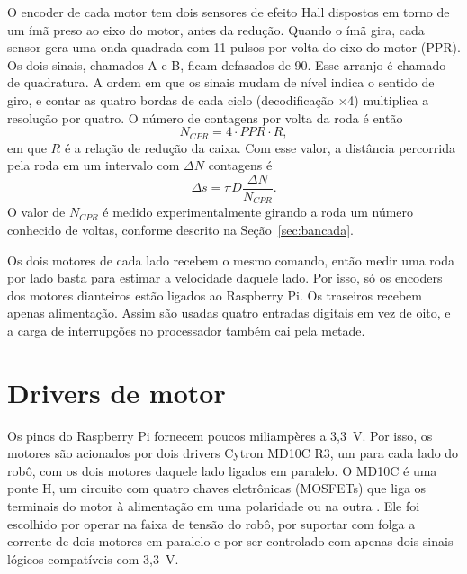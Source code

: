O encoder de cada motor tem dois sensores de efeito Hall dispostos em
torno de um ímã preso ao eixo do motor, antes da redução. Quando o ímã
gira, cada sensor gera uma onda quadrada com 11 pulsos por volta do eixo
do motor (PPR). Os dois sinais, chamados A e B, ficam defasados de
90\textdegree. Esse arranjo é chamado de quadratura. A ordem em que os
sinais mudam de nível indica o sentido de giro, e contar as quatro bordas
de cada ciclo (decodificação $\times$4) multiplica a resolução por quatro.
O número de contagens por volta da roda é então
\begin{equation}
	\label{eq:cpr}
	N_{CPR} = 4 \cdot PPR \cdot R,
\end{equation}
em que $R$ é a relação de redução da caixa. Com esse valor, a distância
percorrida pela roda em um intervalo com $\Delta N$ contagens é
\begin{equation}
	\label{eq:deslocamento}
	\Delta s = \pi D \frac{\Delta N}{N_{CPR}}.
\end{equation}
O valor de $N_{CPR}$ é medido experimentalmente girando a roda um número
conhecido de voltas, conforme descrito na Seção~\ref{sec:bancada}.

Os dois motores de cada lado recebem o mesmo comando, então medir uma
roda por lado basta para estimar a velocidade daquele lado. Por isso, só
os encoders dos motores dianteiros estão ligados ao Raspberry Pi. Os
traseiros recebem apenas alimentação. Assim são usadas quatro entradas
digitais em vez de oito, e a carga de interrupções no processador também
cai pela metade.

\section{Drivers de motor}

Os pinos do Raspberry Pi fornecem poucos miliampères a 3,3~V. Por isso, os
motores são acionados por dois drivers Cytron MD10C R3, um para cada lado
do robô, com os dois motores daquele lado ligados em paralelo. O MD10C é
uma ponte H, um circuito com quatro chaves eletrônicas (MOSFETs) que
liga os terminais do motor à alimentação em uma polaridade ou na outra
\cite{cytronmd10c}. Ele foi escolhido por operar na faixa de tensão do
robô, por suportar com folga a corrente de dois motores em paralelo e por
ser controlado com apenas dois sinais lógicos compatíveis com 3,3~V.


